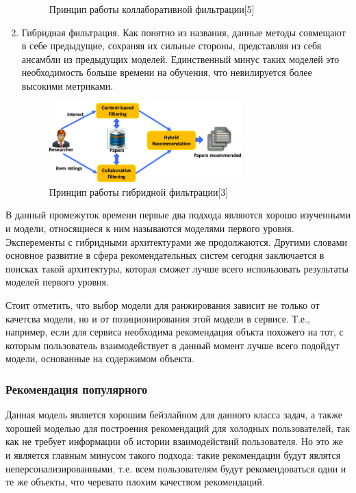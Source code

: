 \documentclass[bachelor, och, coursework]{SCWorks}
\begin{document}
\begin{enumerate}
\begin{figure}[H]
        \caption{Принцип работы коллаборативной фильтрации[5]}
        \label{fig:img1}
    \end{figure}
    \item Гибридная фильтрация. Как понятно из названия, данные методы совмещают в себе предыдущие, сохраняя их сильные
    стороны, представляя из себя ансамбли из предыдущих моделей. Единственный минус таких моделей это необходимость 
    больше времени на обучения, что невилируется более высокими метриками.
    \begin{figure}[H]
        \centering
        \includegraphics[width=0.7\textwidth]{pic/3}
        \caption{Принцип работы гибридной фильтрации[3]}
        \label{fig:img1}
    \end{figure}
\end{enumerate}

В данный промежуток времени первые два подхода являются хорошо изученными и модели, относящиеся к ним называются
моделями первого уровня. Эксперементы с гибридными архитектурами же продолжаются. Другими словами основное развитие
в сфера рекомендательных систем сегодня заключается в поисках такой архитектуры, которая сможет лучше всего использовать
результаты моделей первого уровня.

Стоит отметить, что выбор модели для ранжирования зависит не только от качетсва модели, но и от позиционирования
этой модели в сервисе. Т.е., например, если для сервиса необходима рекомендация объкта похожего на тот, с которым пользователь
взаимодействует в данный момент лучше всего подойдут модели, основанные на содержимом объекта.
\subsubsection{Рекомендация популярного}
Данная модель является хорошим бейзлайном для данного класса задач, а также хорошей моделью для построения
рекомендаций для холодных пользователей, так как не требует информации об истории взаимодействий пользователя.
Но это же и является главным минусом такого подхода: такие рекомендации будут являтся неперсонализированными,
т.е. всем пользователям будут рекомендоваться одни и те же объекты, что черевато плохим качеством рекомендаций.
\end{document}
